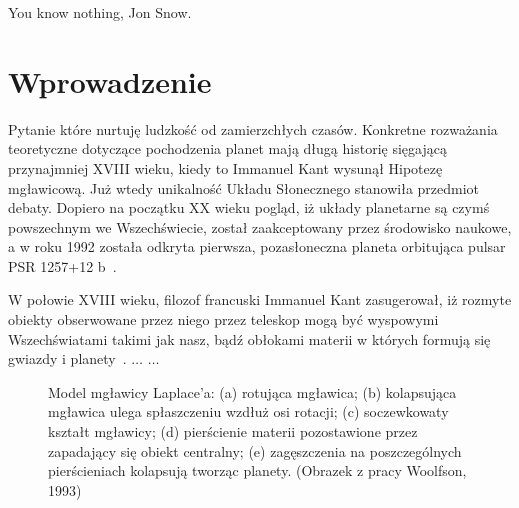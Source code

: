 \begin{savequote}[75mm]
   You know nothing, Jon Snow.
\end{savequote}

\chapter{Wprowadzenie}
 Pytanie które nurtuję ludzkość od
zamierzchłych czasów. Konkretne rozważania teoretyczne dotyczące pochodzenia
planet mają długą historię sięgającą przynajmniej XVIII wieku, kiedy to Immanuel
Kant wysunął \dq{}Hipotezę mgławicową\dq{}. Już wtedy unikalność Układu
Słonecznego stanowiła przedmiot debaty. Dopiero na początku XX wieku pogląd, iż
układy planetarne są czymś powszechnym we Wszechświecie, został zaakceptowany
przez środowisko naukowe, a w roku 1992 została odkryta pierwsza, pozasłoneczna
planeta orbitująca pulsar PSR 1257+12 b~\cite{1992Natur.355..145W}.

W połowie XVIII wieku, filozof francuski Immanuel Kant zasugerował, iż rozmyte
o\-biek\-ty obserwowane przez niego przez teleskop mogą być wyspowymi
Wszechświatami takimi jak nasz, bądź obłokami materii w których formują się
gwiazdy i planety~\cite{ImmanuelKant.etal:2008}. $\ldots$ $\ldots$

\begin{figure}[!ht]
\centering
\caption{Model mgławicy Laplace'a: (a) rotująca mgławica; (b) kolapsująca
mgławica ulega spłaszczeniu wzdłuż osi rotacji; (c) soczewkowaty kształt
mgławicy; (d) pierścienie materii pozostawione przez zapadający się obiekt
centralny; (e) zagęszczenia na poszczególnych pierścieniach kolapsują tworząc
planety. (Obrazek z pracy Woolfson, 1993)} 
\label{fig:laplace}
\end{figure}

